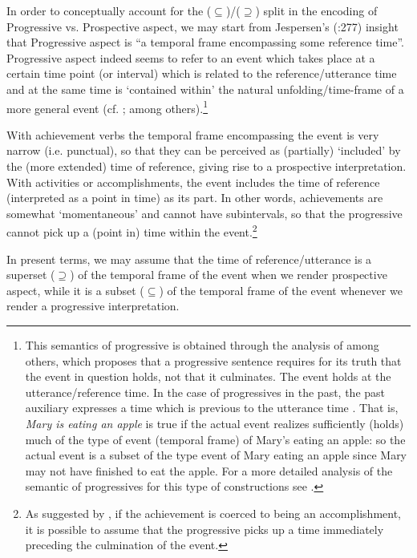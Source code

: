 \documentclass[output=paper,modfonts,nonflat,newtxmath,colorlinks,citecolor=brown]{langsci/langscibook}
\begin{document}
In order to conceptually account for the (${\subseteq}$)/(${\supseteq}$) split in the encoding of Progressive {vs}. Prospective aspect, we may start from Jespersen’s (\citeyear{Jespersen1924}:277) insight that Progressive aspect is “a temporal frame encompassing some reference time”. Progressive aspect indeed seems to refer to an event which takes place at a certain time point (or interval) which is related to the reference/utterance time and at the same time is  ‘contained within’ the natural unfolding/time-frame of a more general event (cf. \citealt{Dowty1979, Higginbotham2004}; among others).\footnote{This semantics of progressive is obtained through the analysis of \citet{Higginbotham2009, Parsons1989, Landman1992} among others, which proposes that a progressive sentence requires for its truth that the event in question {holds}, not that it {culminates}. The event holds at the utterance/reference time. In the case of progressives in the past, the past auxiliary expresses a time which is previous to the utterance time \citep{Higginbotham2009}. That is, \textit{Mary is eating an apple} is true if the actual event realizes sufficiently (holds) much of the type of event (temporal frame) of {Mary’s eating an apple}: so the actual event is a subset of the type event of {Mary eating an appl}e since Mary may not have finished to eat the apple. For a more detailed analysis of the semantic of progressives for this type of constructions see \citet{ManziniEtAl2017}.}

With achievement verbs the temporal frame encompassing the event is very narrow (i.e. punctual), so that they can be perceived as (partially) ‘included’ by the (more extended) time of reference, giving rise to a prospective interpretation. With activities or accomplishments, the event includes the time of reference (interpreted as a point in time) as its part. In other words, achievements are somewhat ‘momentaneous’ and cannot have subintervals, so that the progressive cannot pick up a (point in) time within the event.\footnote{As suggested by \citet{Rothstein2004}, if the achievement is coerced to being an accomplishment, it is possible to assume that the progressive picks up a time immediately preceding the culmination of the event.}

In present terms, we may assume that the time of reference/utterance is a superset (${\supseteq}$) of the temporal frame of the event when we render prospective aspect, while it is a subset (${\subseteq}$) of the temporal frame of the event whenever we render a progressive interpretation.
\end{document}
